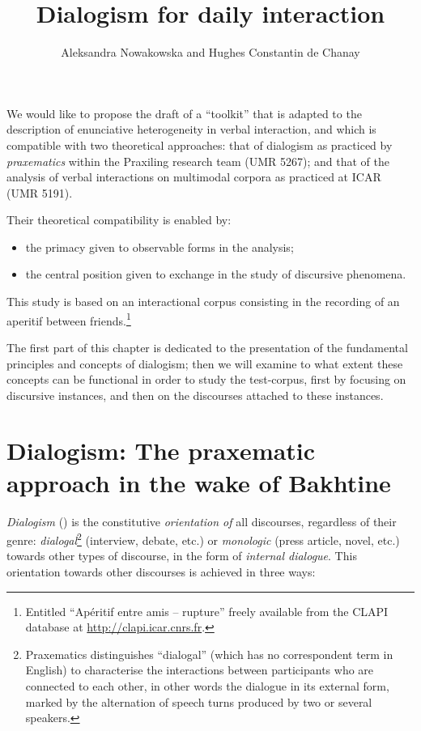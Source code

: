 \documentclass[output=paper]{langscibook}
\author{Aleksandra Nowakowska\affiliation{UMR 5267 Praxiling; Université Paul Valéry Montpellier 3} 
        and Hughes {Constantin de Chanay}\affiliation{UMR 5161 ICAR; Centre National de la Recherche Scientifique; Ecole Normale Supérieure; Université Lumière Lyon 2}}
\title{Dialogism for daily interaction}
\begin{document}
\maketitle 

{We would like to propose the draft of a “toolkit” that is adapted to the description of enunciative heterogeneity in verbal interaction, and which is compatible with two theoretical approaches: that of dialogism as practiced by \textit{praxematics} within the Praxiling research team (UMR 5267); and that of the analysis of verbal interactions on multimodal corpora as practiced at ICAR}{ (UMR 5191).}

Their theoretical compatibility is enabled by:

\begin{itemize}

\item the primacy given to observable forms in the analysis;
\item the central position given to exchange in the study of discursive phenomena.

\end{itemize}


This study is based on an interactional corpus consisting in the recording of an aperitif between friends.\footnote{Entitled “Apéritif entre amis -- rupture” freely available from the CLAPI database at \url{http://clapi.icar.cnrs.fr}.}

The first part of this chapter is dedicated to the presentation of the fundamental principles and concepts of dialogism; then we will examine to what extent these concepts can be functional in order to study the test-corpus, first by focusing on discursive instances, and then on the discourses attached to these instances.

\section{Dialogism: The praxematic approach in the wake of Bakhtine}

\textit{Dialogism} (\citealt{Bakhtine1970,Bakhtine1984}) is the constitutive \textit{orientation of} all discourses, regardless of their genre: \textit{dialogal}\footnote{Praxematics distinguishes “dialogal” (which has no correspondent term in English) to characterise the interactions between participants who are connected to each other, in other words the dialogue in its external form, marked by the alternation of speech turns produced by two or several speakers.} (interview, debate, etc.) or {\textit{monologic}} (press article, novel, etc.) towards other types of discourse, in the form of \textit{internal dialogue}. This orientation towards other discourses is achieved in three ways: 
\end{document}
